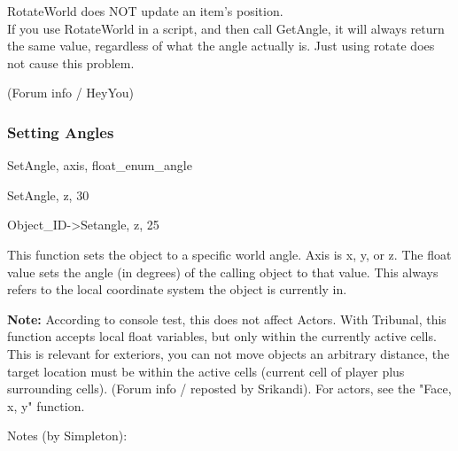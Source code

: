 \documentclass[
]{article}
\begin{document}
RotateWorld does NOT update an item's position.\\
If you use RotateWorld in a script, and then call GetAngle, it will
always return the same value, regardless of what the angle actually is.
Just using rotate does not cause this problem.

(Forum info / HeyYou)

\hypertarget{setting-angles}{%
\subsubsection{\texorpdfstring{Setting Angles
}{Setting Angles }}\label{setting-angles}}

SetAngle, axis, float\_enum\_angle

SetAngle, z, 30

Object\_ID-\textgreater Setangle, z, 25

This function sets the object to a specific world angle. Axis is x, y,
or z. The float value sets the angle (in degrees) of the calling object
to that value. This always refers to the local coordinate system the
object is currently in.

\textbf{Note:} According to console test, this does not affect Actors.
With Tribunal, this function accepts local float variables, but only
within the currently active cells. This is relevant for exteriors, you
can not move objects an arbitrary distance, the target location must be
within the active cells (current cell of player plus surrounding cells).
(Forum info / reposted by Srikandi). For actors, see the "Face, x, y"
function.

Notes (by Simpleton):
\end{document}
